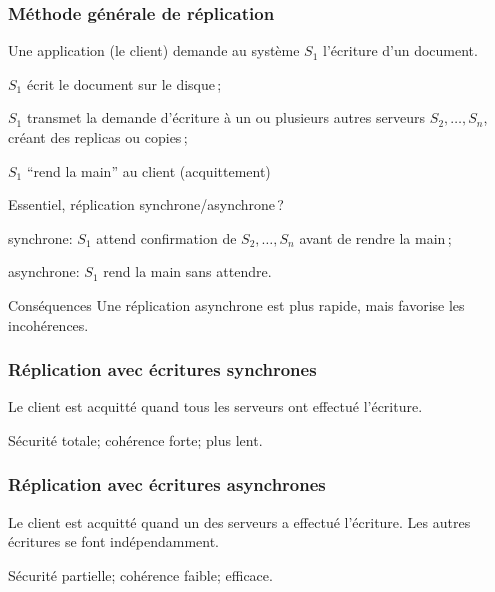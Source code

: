 \begin{frame}
\frametitle{Méthode générale de réplication}

Une \alert{application} (le client) demande au \alert{système}  $S_1$ \alert{l'écriture}
d'un document.

\begin{redbullet}
  \item $S_1$ écrit le document sur le disque\,; 
  \item \alert{$S_1$ transmet la demande d'écriture à un ou plusieurs autres serveurs $S_2, \ldots, S_n$}, créant
     des \alert{replicas} ou \alert{copies}\,;
  \item $S_1$ ``rend la main'' au client (acquittement)
\end{redbullet}

Essentiel, réplication synchrone/asynchrone\,?

\begin{redbullet}
  \item \alert{synchrone}: $S_1$ \alert{attend} confirmation de $S_2, \ldots, S_n$ avant de rendre la main\,; 
 \item \alert{asynchrone}: $S_1$ rend la main \alert{sans attendre}. 
 \end{redbullet}

\begin{remblock}{Conséquences}
Une réplication \alert{asynchrone} est plus rapide, mais  favorise les \alert{incohérences}.
\end{remblock}


\end{frame}

\begin{frame}
\frametitle{Réplication avec écritures synchrones}

Le client est acquitté quand \alert{tous} les serveurs ont effectué l'écriture.

\vfill


\vfill

Sécurité totale; cohérence forte; \alert{plus lent}.

\end{frame}

\begin{frame}
\frametitle{Réplication avec écritures asynchrones}

Le client est acquitté quand \alert{un} des serveurs a effectué l'écriture. Les autres
écritures se font indépendamment.

\vfill


\vfill

Sécurité partielle; cohérence faible; \alert{efficace}.

\end{frame}

